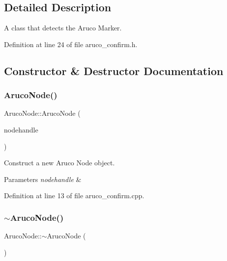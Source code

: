 \subsection{Detailed Description}
A class that detects the Aruco Marker. 

Definition at line 24 of file aruco\+\_\+confirm.\+h.



\subsection{Constructor \& Destructor Documentation}
\mbox{\label{class_aruco_node_ad539e5027a1d41e9e62f354db9ec40aa}} 
\subsubsection{\texorpdfstring{Aruco\+Node()}{ArucoNode()}}
{\footnotesize\ttfamily Aruco\+Node\+::\+Aruco\+Node (\begin{DoxyParamCaption}\item[{ros\+::\+Node\+Handle $\ast$}]{nodehandle }\end{DoxyParamCaption})}



Construct a new Aruco Node object. 


\begin{DoxyParams}{Parameters}
{\em nodehandle} & \\
\hline
\end{DoxyParams}


Definition at line 13 of file aruco\+\_\+confirm.\+cpp.

\mbox{\label{class_aruco_node_a134694163a28530a800198e2c039eb25}} 
\subsubsection{\texorpdfstring{$\sim$\+Aruco\+Node()}{~ArucoNode()}}
{\footnotesize\ttfamily Aruco\+Node\+::$\sim$\+Aruco\+Node (\begin{DoxyParamCaption}{ }\end{DoxyParamCaption})\hspace{0.3cm}{\ttfamily [inline]}}



